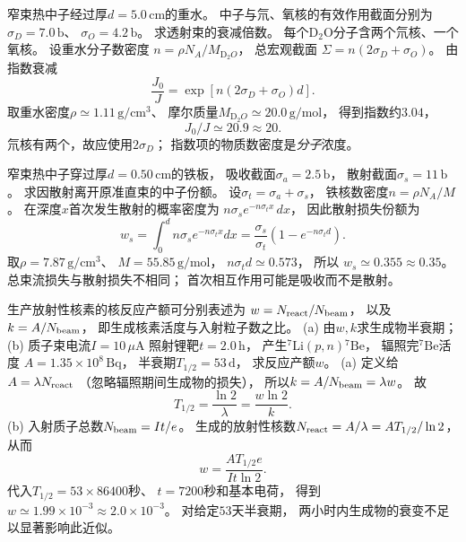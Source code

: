 窄束热中子经过厚$d=5.0\,\mathrm{cm}$的重水。
中子与氘、氧核的有效作用截面分别为
$\sigma_D=7.0\,\mathrm b$、
$\sigma_O=4.2\,\mathrm b$。
求透射束的衰减倍数。
\exsolution
每个$\mathrm D_2\mathrm O$分子含两个氘核、一个氧核。
设重水分子数密度
$n=\rho N_A/M_{\mathrm D_2O}$，
总宏观截面
$\Sigma=n(2\sigma_D+\sigma_O)$。
由指数衰减
\[
 \boxed{\frac{J_0}{J}=
 \exp[n(2\sigma_D+\sigma_O)d]}.
\]
取重水密度$\rho\simeq1.11\,\mathrm{g/cm^3}$、
摩尔质量$M_{\mathrm D_2O}\simeq20.0\,\mathrm{g/mol}$，
得到指数约$3.04$，
\[
 \boxed{J_0/J\simeq20.9\approx20}.
\]
\excheck 氘核有两个，故应使用$2\sigma_D$；
指数项的物质数密度是\emph{分子}浓度。

窄束热中子穿过厚$d=0.50\,\mathrm{cm}$的铁板，
吸收截面$\sigma_a=2.5\,\mathrm b$，
散射截面$\sigma_s=11\,\mathrm b$。
求因散射离开原准直束的中子份额。
\exsolution
设$\sigma_t=\sigma_a+\sigma_s$，
铁核数密度$n=\rho N_A/M$。
在深度$x$首次发生散射的概率密度为
$n\sigma_se^{-n\sigma_tx}\,dx$，
因此散射损失份额为
\[
 w_s=\int_0^d n\sigma_se^{-n\sigma_tx}dx
 =\boxed{\frac{\sigma_s}{\sigma_t}
 \left(1-e^{-n\sigma_t d}\right)}.
\]
取$\rho=7.87\,\mathrm{g/cm^3}$、
$M=55.85\,\mathrm{g/mol}$，
$n\sigma_td\simeq0.573$，
所以
$\boxed{w_s\simeq0.355\approx0.35}$。
\excheck 总束流损失与散射损失不相同；
首次相互作用可能是吸收而不是散射。

生产放射性核素的核反应产额可分别表述为
$w=N_{\rm react}/N_{\rm beam}$，
以及$k=A/N_{\rm beam}$，
即生成核素活度与入射粒子数之比。
(a) 由$w,k$求生成物半衰期；
(b) 质子束电流$I=10\,\mu\mathrm A$
照射锂靶$t=2.0\,\mathrm h$，
产生$^{7}\mathrm{Li}(p,n){}^{7}\mathrm{Be}$，
辐照完$^{7}\mathrm{Be}$活度
$A=1.35\times10^8\,\mathrm{Bq}$，
半衰期$T_{1/2}=53\,\mathrm d$，
求反应产额$w$。
\exsolution
(a) 定义给$A=\lambda N_{\rm react}$
（忽略辐照期间生成物的损失），
所以$k=A/N_{\rm beam}=\lambda w$。
故
\[
 \boxed{T_{1/2}=\frac{\ln2}{\lambda}
 =\frac{w\ln2}{k}}.
\]
(b) 入射质子总数$N_{\rm beam}=It/e$。
生成的放射性核数$N_{\rm react}=A/\lambda=AT_{1/2}/\ln2$，
从而
\[
 \boxed{w=
 \frac{AT_{1/2}e}{It\ln2}}.
\]
代入$T_{1/2}=53\times86400$秒、
$t=7200$秒和基本电荷，
得到
$\boxed{w\simeq1.99\times10^{-3}\approx2.0\times10^{-3}}$。
\excheck 对给定$53$天半衰期，
两小时内生成物的衰变不足以显著影响此近似。

